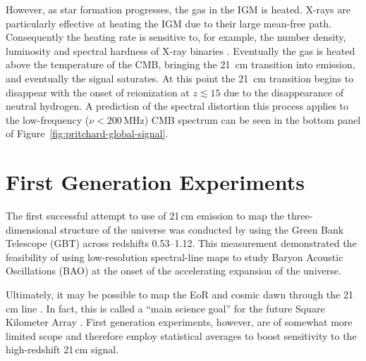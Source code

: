 \begin{bibunit}
However, as star formation progresses, the gas in the IGM is heated. X-rays are particularly
effective at heating the IGM due to their large mean-free path. Consequently the heating rate is
sensitive to, for example, the number density, luminosity and spectral hardness of X-ray binaries
\citep{2014MNRAS.437L..36F,2017MNRAS.472.2651G}.  Eventually the gas is heated above the temperature
of the CMB, bringing the 21~cm transition into emission, and eventually the signal saturates. At
this point the 21~cm transition begins to disappear with the onset of reionization at $z \lesssim
15$ due to the disappearance of neutral hydrogen. A prediction of the spectral distortion this
process applies to the low-frequency ($\nu < 200\,\text{MHz}$) CMB spectrum can be seen in the
bottom panel of Figure~\ref{fig:pritchard-global-signal}.












\section{First Generation Experiments}

The first successful attempt to use of 21\,cm emission to map the three-dimensional structure of the
universe was conducted by \citet{2010Natur.466..463C} using the Green Bank Telescope (GBT) across
redshifts 0.53--1.12. This measurement demonstrated the feasibility of using low-resolution
spectral-line maps to study Baryon Acoustic Oscillations (BAO) at the onset of the accelerating
expansion of the universe.

Ultimately, it may be possible to map the EoR and cosmic dawn through the 21\,cm line
\citep{1997ApJ...475..429M}. In fact, this is called a ``main science goal'' for the future Square
Kilometer Array \citep[SKA;][]{2013ExA....36..235M}.  First generation experiments, however, are of
somewhat more limited scope and therefore employ statistical averages to boost sensitivity to the
high-redshift 21\,cm signal.


\end{bibunit}
